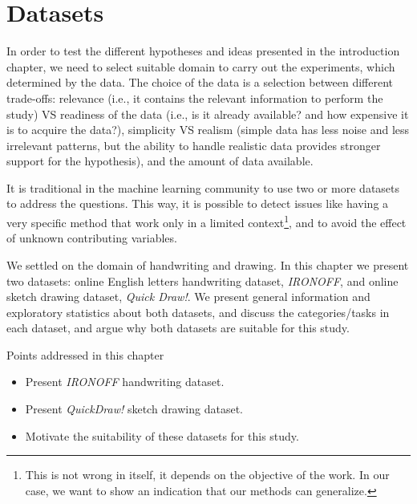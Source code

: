\chapter{Datasets} \label{ch:dataset}
\minitoc%

\par In order to test the different hypotheses and ideas presented in the introduction chapter, we need to select suitable domain to carry out the experiments, which determined by the data. The choice of the data is a selection between different trade-offs: relevance (i.e., it contains the relevant information to perform the study) VS readiness of the data (i.e., is it already available? and how expensive it is to acquire the data?), simplicity VS realism (simple data has less noise and less irrelevant patterns, but the ability to handle realistic data provides stronger support for the hypothesis), and the amount of data available.

\par It is traditional in the machine learning community to use two or more datasets to address the questions. This way, it is possible to detect issues like having a very specific method that work only in a limited context\footnote{This is not wrong in itself, it depends on the objective of the work. In our case, we want to show an indication that our methods can generalize.}, and to avoid the effect of unknown contributing variables.

\par We settled on the domain of handwriting and drawing. In this chapter we present two datasets: online English letters handwriting dataset, \textit{IRONOFF}, and online sketch drawing dataset, \textit{Quick Draw!}. We present general information and exploratory statistics about both datasets, and discuss the categories/tasks in each dataset, and argue why both datasets are suitable for this study.

\begin{mdframed}[backgroundcolor=blue!20]
    \begin{center}
        Points addressed in this chapter
    \end{center}

    \begin{itemize}
        \item Present \textit{IRONOFF} handwriting dataset.
        \item Present \textit{QuickDraw!} sketch drawing dataset.
        \item Motivate the suitability of these datasets for this study.
    \end{itemize}
\end{mdframed}

